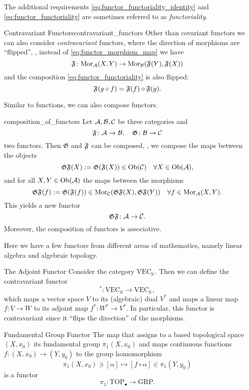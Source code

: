 The additional requirements \eqref{eq:functor_functoriality_identity} and \eqref{eq:functor_functoriality} are sometimes referred to as \emph{functoriality}.

\begin{myremark}{Contravariant Functors}{contravariant_functors}
Other than covariant functors we can also consider \emph{contravariant} functors, where the direction of morphisms are ``flipped'', \ie, instead of \eqref{eq:functor_morphism_map} we have
$$
\mathfrak{F}\colon \mathrm {Mor}_{\mathcal{A}}(X,Y) \to \mathrm {Mor}_{\mathcal{B}}(\mathfrak{F}(Y), \mathfrak{F}(X))
$$
and the composition \eqref{eq:functor_functoriality} is also flipped:
$$
\mathfrak{F}(g \circ f) = \mathfrak{F}(f) \circ \mathfrak{F}(g).
$$
\end{myremark}


Similar to functions, we can also compose functors.

\begin{defprop}{\cite[Sec.~1.3.1]{Roman2017}}{composition_of_functors}
Let $\mathcal{A}, \mathcal{B}, \mathcal{C}$ be three categories and
$$
\mathfrak{F}\colon \mathcal{A} \to \mathcal{B}, \quad \mathfrak{G}\colon \mathcal{B} \to \mathcal{C}
$$
two functors. Then $\mathfrak{G}$ and $\mathfrak{F}$ can be composed, \ie, we compose the maps between the objects 
$$
\mathfrak{G} \mathfrak{F} (X) := \mathfrak{G}(\mathfrak{F}(X)) \in \mathrm {Ob}(\mathcal{C}) \quad \forall X \in \mathrm {Ob}(\mathcal{A}),
$$
and for all $X,Y \in \mathrm {Ob}(\mathcal{A})$ the maps between the morphisms
$$
\mathfrak{G} \mathfrak{F} (f) := \mathfrak{G}(\mathfrak{F}(f)) \in \mathrm {Mor}_{\mathcal{C}}(\mathfrak{G} \mathfrak{F} (X), \mathfrak{G} \mathfrak{F} (Y)) \quad \forall f \in \mathrm {Mor}_{\mathcal{A}}(X,Y).
$$
This yields a new functor
$$
\mathfrak{G} \mathfrak{F}\colon \mathcal{A} \to \mathcal{C}.
$$
Moreover, the composition of functors is associative.
\end{defprop}

Here we have a few functors from different areas of mathematics, namely linear algebra and algebraic topology.

\begin{example}{The Adjoint Functor \cite[Ex.~1.2.12]{Leinster2014-dc}}{}
Consider the category $\mathrm{VEC}_\mathbb{K}$. Then we can define the contravariant functor
$$
^* \colon \mathrm{VEC}_\mathbb{K} \to \mathrm{VEC}_\mathbb{K},
$$
which maps a vector space $V$ to its (algebraic) dual $V^*$ and maps a linear map $f\colon V \to W$ to its adjoint map $f^*\colon W^* \to V^*$. In particular, this functor is contravariant since it ``flips the direction'' of the morphisms.
\end{example}


\begin{example}{Fundamental Group Functor \cite[Sec.~1.1.2]{Hatcher2001}}{}
The map that assigns to a based topological space $(X,x_0)$ its fundamental group $\pi_1(X,x_0)$ and maps continuous functions $f\colon (X,x_0) \to (Y,y_0)$ to the group homomorphism 
$$
\pi_1(X,x_0) \ni [\alpha] \mapsto [f \circ \alpha] \in \pi_1(Y,y_0)
$$
is a functor
$$
\pi_1\colon \mathrm{TOP}_\bullet \to \mathrm{GRP}.
$$
\end{example}

